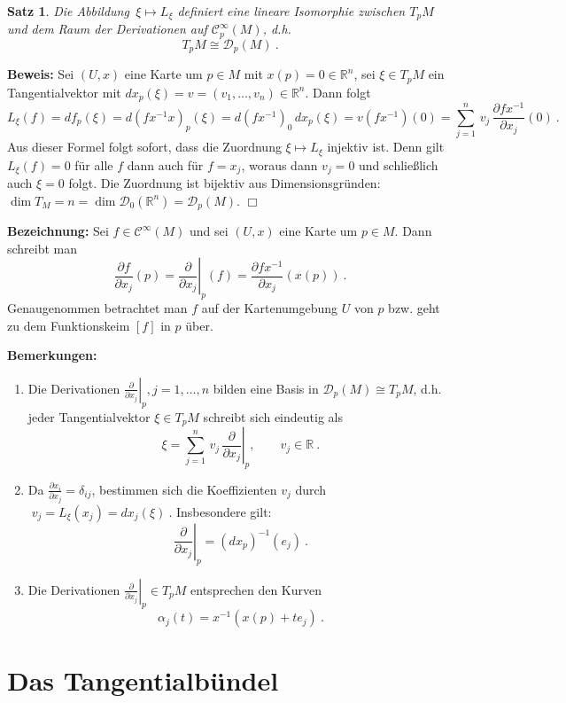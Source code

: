 \documentclass[12pt,a4paper]{article}
\def\R{\mathbb{R}}
\newtheorem{Satz}[Lemma]{Satz}
\def\proof{\noindent\textbf{Beweis:}\quad}
\def\qed{\quad\hfill\ensuremath{\Box}}
\begin{document}
\bigskip

\begin{Satz}
Die Abbildung $\,\xi\mapsto L_\xi$ definiert eine lineare Isomorphie zwischen $T_pM$ und dem
Raum der Derivationen auf $\mathcal C^\infty_p(M)$, d.h.
$$
T_pM \cong \mathcal D_p(M) \ .
$$
\end{Satz}
\proof
Sei $(U,x)$ eine Karte um $p\in M$ mit $x(p)=0\in\R^n$, sei $\xi\in T_pM$ ein Tangentialvektor
mit $dx_p(\xi)=v= (v_1,\ldots, v_n)\in \R^n$. Dann folgt
$$
L_\xi(f) = df_p(\xi) = d (f  x^{-1} x )_p(\xi)= d(f x^{-1})_0\,dx_p(\xi) = v(f x^{-1})(0)
= \sum^n_{j=1}\, v_j \, \frac{\partial f x^{-1}}{\partial x_j}(0) \ .
$$
Aus dieser Formel folgt sofort, dass die Zuordnung $\xi \mapsto L_\xi$ injektiv ist. Denn gilt
$L_\xi(f)=0$ f\"ur alle $f$ dann auch f\"ur $f=x_j$, woraus dann $v_j=0$ und schlie\ss lich auch
$\xi=0$ folgt. Die Zuordnung ist bijektiv aus Dimensionsgr\"unden: $\dim T_M = n = \dim \mathcal D_0(\R^n)
= \mathcal D_p(M)$.
\qed

\bigskip

{\bf Bezeichnung:}
Sei $f \in \mathcal C^\infty(M)$ und sei $(U,x)$ eine Karte um $p\in M$. Dann schreibt man
$$
\frac{\partial f }{\partial x_j}(p) = \left.\frac{\partial }{\partial x_j}\right|_p(f)
= \frac{\partial f x^{-1}}{\partial x_j}(x(p)) \ .
$$
Genaugenommen betrachtet man $f$ auf der Kartenumgebung $U$ von $p$ bzw. geht zu dem Funktionskeim
$[f]$ in $p$ \"uber.

\bigskip

{\bf Bemerkungen:}
\begin{enumerate}
\item
Die Derivationen $\left.\frac{\partial }{\partial x_j}\right|_p, j=1,\ldots,  n$ bilden eine Basis
in $\mathcal D_p(M)\cong T_pM$, d.h. jeder Tangentialvektor $\xi \in T_pM$ schreibt sich eindeutig
als
$$
\xi = \sum^n_{j=1} \, v_j \, \left.\frac{\partial }{\partial x_j}\right|_p, \qquad v_j \in \R \ .
$$
\item
Da $\frac{\partial x_i}{\partial x_j}= \delta_{ij}$, bestimmen sich die Koeffizienten $v_j$ durch
$\;
v_j = L_\xi(x_j) = dx_j(\xi) \ .
$
Insbesondere gilt:
$$
\left.\frac{\partial }{\partial x_j}\right|_p = (dx_p)^{-1} (e_j) \ .
$$

\item
Die Derivationen $\left.\frac{\partial }{\partial x_j}\right|_p \in T_pM$ entsprechen den Kurven
$$
\alpha_j(t) = x^{-1} (x(p) + te_j) \ .
$$
\end{enumerate}

\section{Das Tangentialb\"undel}
\end{document}
